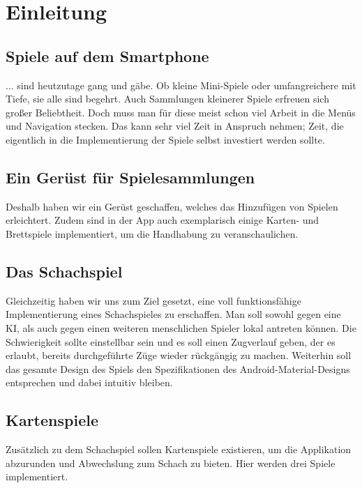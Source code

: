 \chapter{Einleitung}

\section{Spiele auf dem Smartphone}
\sectionauthor{\leonard}

... sind heutzutage gang und gäbe. Ob kleine Mini-Spiele oder umfangreichere mit
Tiefe, sie alle sind begehrt. Auch Sammlungen kleinerer Spiele erfreuen sich
großer Beliebtheit.  Doch muss man für diese meist schon viel Arbeit in die
Menüs und Navigation stecken. Das kann sehr viel Zeit in Anspruch nehmen; Zeit,
die eigentlich in die Implementierung der Spiele selbst investiert werden
sollte.

\section{Ein Gerüst für Spielesammlungen}
\sectionauthor{\leonard}

Deshalb haben wir ein Gerüst geschaffen, welches das Hinzufügen von Spielen
erleichtert. Zudem sind in der App auch exemplarisch einige Karten- und
Brettspiele implementiert, um die Handhabung zu veranschaulichen.

\section{Das Schachspiel}
\sectionauthor{\frank}

Gleichzeitig haben wir uns zum Ziel gesetzt, eine voll funktionsfähige
Implementierung eines Schachspieles zu erschaffen. Man soll sowohl gegen eine
KI, als auch gegen einen weiteren menschlichen Spieler lokal antreten können.
Die Schwierigkeit sollte einstellbar sein und es soll einen Zugverlauf geben,
der es erlaubt, bereits durchgeführte Züge wieder rückgängig zu machen.
Weiterhin soll das gesamte Design des Spiels den Spezifikationen des
Android-Material-Designs entsprechen und dabei intuitiv bleiben.

\section{Kartenspiele}
\sectionauthor{\frank}

Zusätzlich zu dem Schachspiel sollen Kartenspiele existieren, um die Applikation
abzurunden und Abwechslung zum Schach zu bieten. Hier werden drei Spiele
implementiert.
